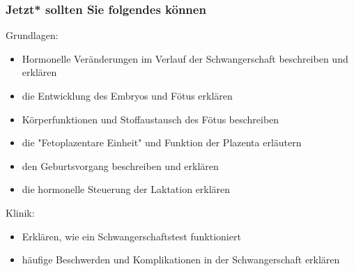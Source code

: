 \documentclass{beamer}
\begin{document}

\begin{frame}

 \frametitle{Jetzt* sollten Sie folgendes können}



\begin{block}{Grundlagen:}
\begin{itemize}
\item
Hormonelle Veränderungen im Verlauf der Schwangerschaft beschreiben und erklären
\item
die Entwicklung des Embryos und Fötus erklären 
\item
Körperfunktionen und Stoffaustausch des Fötus beschreiben
\item
die "Fetoplazentare Einheit" und Funktion der Plazenta erläutern
\item
den Geburtsvorgang beschreiben und erklären
\item
die hormonelle Steuerung der Laktation erklären

\end{itemize}

\end{block}



\begin{block}{Klinik:}
\begin{itemize}
\item
Erklären, wie ein Schwangerschaftstest funktioniert
\item
häufige Beschwerden und Komplikationen in der Schwangerschaft erklären

\end{itemize}

\end{block}

\end{frame}





\end{document}
